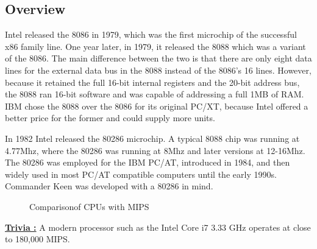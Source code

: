 \documentclass[book.tex]{subfiles}
\begin{document}
\subsection{Overview}
  Intel released the 8086 in 1979, which was the first microchip of the successful x86 family line. One year later, in 1979, it released the 8088 which was a variant of the 8086. The main difference between the two is that there are only eight data lines for the external data bus in the 8088 instead of the 8086's 16 lines.  However, because it retained the full 16-bit internal registers and the 20-bit address bus, the 8088 ran 16-bit software and was capable of addressing a full 1MB of RAM. IBM chose the 8088 over the 8086 for its original PC/XT, because Intel offered a better price for the former and could supply more units. \\
  \par
  In 1982 Intel released the 80286 microchip. A typical 8088 chip was running at 4.77Mhz, where the 80286 was running at 8Mhz and later versions at 12-16Mhz. The 80286 was employed for the IBM PC/AT, introduced in 1984, and then widely used in most PC/AT compatible computers until the early 1990s. Commander Keen was developed with a 80286 in mind.\\   

\par


\begin{figure}[H]
\centering
   \caption{Comparison\protect\footnotemark of CPUs with MIPS}
 \end{figure}
 \par
 \par
  \textbf{\underline{Trivia :}} A modern processor such as the Intel Core i7 3.33 GHz operates at close to 180,000 MIPS.\\
  \par
\end{document}

